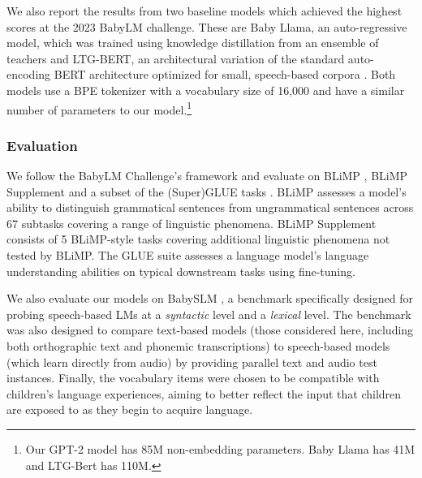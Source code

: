 We also report the results from two baseline models which achieved the highest scores at the 2023 BabyLM challenge. These are Baby Llama, an auto-regressive model, which was trained using knowledge distillation from an ensemble of teachers \citep{timiryasov-tastet-2023-baby} and LTG-BERT, an architectural variation of the standard auto-encoding BERT architecture optimized for small, speech-based corpora \citep{samuel-etal-2023-trained, charpentier-samuel-2023-layers}. Both models use a BPE tokenizer with a vocabulary size of 16,000 and have a similar number of parameters to our model.\footnote{Our GPT-2 model has 85M non-embedding parameters. Baby Llama has 41M and LTG-Bert has 110M.}  

\subsubsection{Evaluation}
\label{sec:evaluation}

We follow the BabyLM Challenge's framework and evaluate on BLiMP \citep{warstadt-etal-2020-blimp-benchmark}, BLiMP Supplement \citep{choshen-et-al-2024-callforpapers-babylm2} and a subset of the (Super)GLUE tasks \citep{wang-etal-2018-glue, wang-etal-2019-superglue}. BLiMP assesses a model's ability to distinguish grammatical sentences from ungrammatical sentences across 67 subtasks covering a range of linguistic phenomena. BLiMP Supplement consists of 5 BLiMP-style tasks covering additional linguistic phenomena not tested by BLiMP. The GLUE suite assesses a language model's language understanding abilities on typical downstream tasks using fine-tuning. 



We also evaluate our models on BabySLM \citep{lavechin}, a benchmark specifically designed for probing speech-based LMs at a \emph{syntactic} level and a \emph{lexical} level. The benchmark was also designed to compare text-based models (those considered here, including both orthographic text and phonemic transcriptions) to speech-based models (which learn directly from audio) by providing parallel text and audio test instances. Finally, the vocabulary items were chosen to be compatible with children’s language experiences, aiming to better reflect the input that children are exposed to as they begin to acquire language. 

